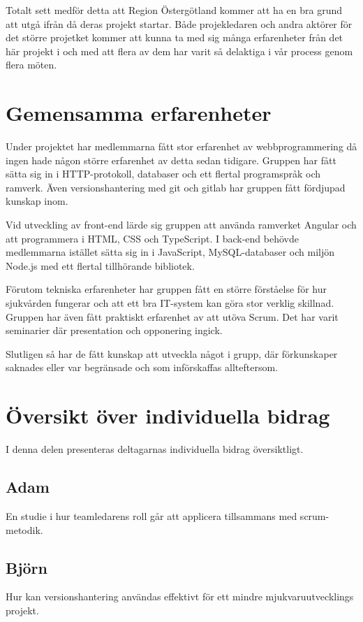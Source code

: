 Totalt sett medför detta att Region Östergötland kommer att ha en bra grund att utgå ifrån då deras projekt startar. Både projekledaren och andra aktörer för det större projetket kommer att kunna ta med sig många erfarenheter från det här projekt i och med att flera av dem har varit så delaktiga i vår process genom flera möten.

\section{Gemensamma erfarenheter}
Under projektet har medlemmarna fått stor erfarenhet av webbprogrammering då ingen hade någon större erfarenhet av detta sedan tidigare. Gruppen har fått sätta sig in i HTTP-protokoll, databaser och ett flertal programspråk och ramverk. Även versionshantering med git och gitlab har gruppen fått fördjupad kunskap inom.

Vid utveckling av front-end lärde sig gruppen att använda ramverket Angular och att programmera i HTML, CSS och TypeScript. I back-end behövde medlemmarna istället sätta sig in i JavaScript, MySQL-databaser och miljön Node.js med ett flertal tillhörande bibliotek.

Förutom tekniska erfarenheter har gruppen fått en större förståelse för hur sjukvården fungerar och att ett bra IT-system kan göra stor verklig skillnad. Gruppen har även fått praktiskt erfarenhet av att utöva Scrum. Det har varit seminarier där presentation och opponering ingick.

Slutligen så har de fått kunskap att utveckla något i grupp, där förkunskaper saknades eller var begränsade och som införskaffas allteftersom.

\section{Översikt över individuella bidrag}
I denna delen presenteras deltagarnas individuella bidrag översiktligt.

\subsection{Adam}
En studie i hur teamledarens roll går att applicera tillsammans med scrum-metodik.
\subsection{Björn}
Hur kan versionshantering användas effektivt för ett mindre mjukvaruutvecklings projekt.
